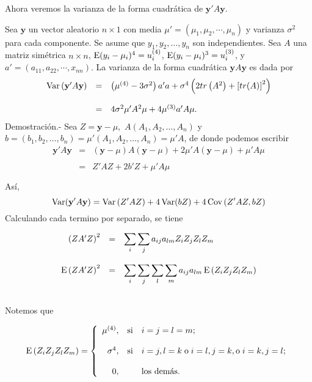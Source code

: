 Ahora veremos la varianza de la forma cuadrática de $\textbf{y}'A\textbf{y}$.

\begin{teo}
    Sea $\textbf{y}$ un vector aleatorio $n\times 1$ con media $\mu'=(\mu_1,\mu_2,\cdots,\mu_n)$ y varianza $\sigma^2$ para cada componente. Se asume que $y_1,y_2,\ldots,y_n$ son independientes. Sea $A$ una matriz simétrica $n\times n$, $\mathop{\mbox{\normalfont E}}\nolimits(y_i-\mu_i)^4=u_i^{(4)}$, $\mathop{\mbox{\normalfont E}}\nolimits(y_i-\mu_i)^3=u_i^{(3)}$, y $a'=(a_{11},a_{22},\cdots,x_{nn})$. La varianza de la forma cuadrática $\textbf{y}A\textbf{y}$ es dada por 
    $$
    \begin{array}{rcl}
	\mathop{\mbox{\normalfont Var}}\nolimits\left(\textbf{y}'A\textbf{y}\right) &=& \left(\mu^{(4)}-3\sigma^2\right)a'a+\sigma^4\left(2tr\left(A^2\right)+\left[tr(A)\right]^2\right)\\\\
						&=& 4\sigma^2\mu'A^2\mu+4\mu^{(3)}a'A\mu.
    \end{array}
    $$
    \vspace{.5cm}
	Demostración.-\; Sea $Z=\textbf{y}-\mu,$ $A(A_1,A_2,\ldots,A_n)$ y $b=(b_1,b_2,\ldots,b_n)=\mu'(A_1,A_2,\ldots,A_n)=\mu'A$, de donde podemos escribir
    $$
    \begin{array}{rcl}
	\textbf{y}'A\textbf{y} &=& (\textbf{y}-\mu)A(\textbf{y}-\mu)+2\mu'A(\textbf{y}-\mu)+\mu'A\mu\\\\
			       &=& Z'AZ+2b'Z+\mu'A\mu\\\\
    \end{array}
    $$
    Así,
    $$\mathop{\mbox{\normalfont Var}}\nolimits(\textbf{y}'A\textbf{y})=\mathop{\mbox{\normalfont Var}}\nolimits\left(Z'AZ\right)+4\mathop{\mbox{\normalfont Var}}\nolimits(bZ)+4\mathop{\mbox{\normalfont Cov}}\nolimits\left(Z'AZ,bZ\right)$$
    Calculando cada termino por separado, se tiene

    $$
    \begin{array}{rcl}
	\left(ZA'Z\right)^2 &=& \displaystyle\sum_i\sum_j a_{ij}a_{lm} Z_iZ_jZ_lZ_m\\\\
	\mathop{\mbox{\normalfont E}}\nolimits\left(ZA'Z\right)^2 &=& \displaystyle\sum_i\sum_j\sum_l\sum_m a_{ij}a_{lm} \mathop{\mbox{\normalfont E}}\nolimits\left(Z_iZ_jZ_lZ_m\right)\\\\
    \end{array}
    $$

    Notemos que

    $$
    \mathop{\mbox{\normalfont E}}\nolimits\left(Z_iZ_jZ_lZ_m\right) = 
    \left\{
	\begin{array}{rcl}
	    \mu^{(4)}, &\text{si} & i=j=l=m;\\\\
	    \sigma^4, &\text{si} & i=j, l=k\; \mbox{o}\; i=l, j=k, \mbox{o}\; i=k, j=l;\\\\
	    0, & &\mbox{los demás}.
	\end{array}
    \right.
    $$


\end{teo}
